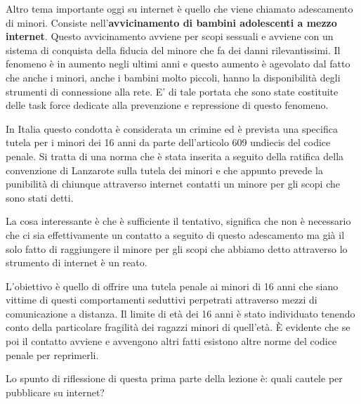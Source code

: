  Altro tema importante oggi su internet è quello che viene chiamato adescamento di minori. Consiste nell'\textbf{avvicinamento di bambini adolescenti a mezzo internet}. Questo avvicinamento avviene per scopi sessuali e avviene con un sistema di conquista della fiducia del minore che fa dei danni rilevantissimi. Il fenomeno è in aumento negli ultimi anni e questo aumento è agevolato dal fatto che anche i minori, anche i bambini molto piccoli, hanno la disponibilità degli strumenti di connessione alla rete. E' di tale portata che sono state costituite delle task force dedicate alla prevenzione e repressione di questo fenomeno.\par
 In Italia questo condotta è considerata un crimine ed è prevista una specifica tutela per i minori dei 16 anni da parte dell'articolo 609 undiecis del codice penale. Si tratta di una norma che è stata inserita a seguito della ratifica della convenzione di Lanzarote sulla tutela dei minori e che appunto prevede la punibilità di chiunque attraverso internet contatti un minore per gli scopi che sono stati detti.\par
 La cosa interessante è che è sufficiente il tentativo, significa che non è necessario che ci sia effettivamente un contatto a seguito di questo adescamento ma già il solo fatto di raggiungere il minore per gli scopi che abbiamo detto attraverso lo strumento di internet è un reato.\par
 L'obiettivo è quello di offrire una tutela penale ai minori di 16 anni che siano vittime di questi comportamenti seduttivi perpetrati attraverso mezzi di comunicazione a distanza. Il limite di età dei 16 anni è stato individuato tenendo conto della particolare fragilità dei ragazzi minori di quell'età. È evidente che se poi il contatto avviene e avvengono altri fatti esistono altre norme del codice penale per reprimerli.\par
 Lo spunto di riflessione di questa prima parte della lezione è: quali cautele per pubblicare su internet? 
 
